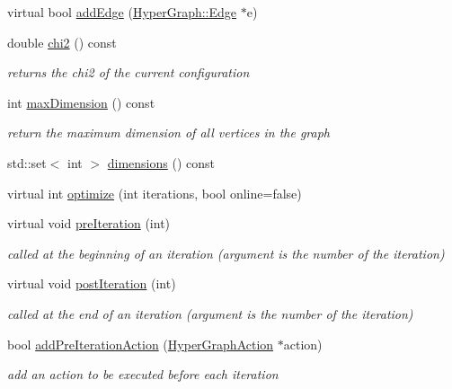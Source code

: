 \begin{DoxyCompactItemize}
\item 
virtual bool \mbox{\hyperlink{structg2o_1_1_optimizable_graph_a6831ed69fce3dba691f53302a2813070}{add\+Edge}} (\mbox{\hyperlink{classg2o_1_1_hyper_graph_1_1_edge}{Hyper\+Graph\+::\+Edge}} $\ast$e)
\item 
double \mbox{\hyperlink{structg2o_1_1_optimizable_graph_af0d53383e22347aba1bf76c1ce492f51}{chi2}} () const
\begin{DoxyCompactList}\small\item\em returns the chi2 of the current configuration \end{DoxyCompactList}\item 
int \mbox{\hyperlink{structg2o_1_1_optimizable_graph_aec95bac1366d39b40703f2aca375f505}{max\+Dimension}} () const
\begin{DoxyCompactList}\small\item\em return the maximum dimension of all vertices in the graph \end{DoxyCompactList}\item 
std\+::set$<$ int $>$ \mbox{\hyperlink{structg2o_1_1_optimizable_graph_a396e552ed234fe625e3b6785efa9c86d}{dimensions}} () const
\item 
virtual int \mbox{\hyperlink{structg2o_1_1_optimizable_graph_ac1b2e36c05680dd3e60ed6f90dddf5d8}{optimize}} (int iterations, bool online=false)
\item 
virtual void \mbox{\hyperlink{structg2o_1_1_optimizable_graph_ad295e7f06651db627b8ebde3d8898bab}{pre\+Iteration}} (int)
\begin{DoxyCompactList}\small\item\em called at the beginning of an iteration (argument is the number of the iteration) \end{DoxyCompactList}\item 
virtual void \mbox{\hyperlink{structg2o_1_1_optimizable_graph_ac8d41dc0830f1ae07e9cb4a8341d3ffb}{post\+Iteration}} (int)
\begin{DoxyCompactList}\small\item\em called at the end of an iteration (argument is the number of the iteration) \end{DoxyCompactList}\item 
bool \mbox{\hyperlink{structg2o_1_1_optimizable_graph_a2ab7899a0ff7bc29177e9447a10d508c}{add\+Pre\+Iteration\+Action}} (\mbox{\hyperlink{classg2o_1_1_hyper_graph_action}{Hyper\+Graph\+Action}} $\ast$action)
\begin{DoxyCompactList}\small\item\em add an action to be executed before each iteration \end{DoxyCompactList}\item 

\end{DoxyCompactItemize}
